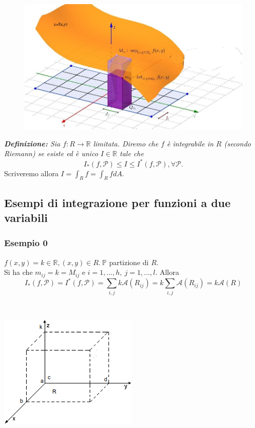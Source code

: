 \documentclass[10pt]{article}
\theoremstyle{plain}
\theoremstyle{definition}
\begin{document}
\begin{figure}[ht]
\centering
\centerline{\includegraphics[width=93 mm,scale=1]{fig4.jpg}}
\label{fig: }
\end{figure}

\textit{\textbf{Definizione:} Sia $f:R\to \mathbb{R}$ limitata. Diremo che $f$ è integrabile in $R$ (secondo Riemann) se esiste ed è unico $I\in \mathbb{R}$ tale che
\begin{equation*}
    I_*(f,\mathcal{P})\leq I \leq I^*(f,\mathcal{P}), \forall \mathcal{P}.
\end{equation*}
}
Scriveremo allora $I=\int_Rf=\int_RfdA$.
\subsection{Esempi di integrazione per funzioni a due variabili}
\subsubsection{Esempio 0}
$f(x,y)=k \in \mathbb{R}, (x,y) \in R.\ \mathbb{P}$ partizione di $R$.\\ Si ha che $m_{ij}=k=M_{ij}$ e $ i=1,...,h,\ j=1,...,l$. Allora 
\begin{equation*}
    I_*(f,\mathcal{P})=I^*(f,\mathcal{P})=\sum_{i,j}k\mathcal{A}(R_{ij})=k\sum_{i,j}\mathcal{A}(R_{ij})=k\mathcal{A}(R)
\end{equation*}

\
\begin{minipage}{.5\textwidth}
\end{minipage}%
\begin{minipage}{.50\textwidth}
\centering
\includegraphics[width=.9\textwidth]{fig5.png}
\end{minipage}
\\
\end{document}
